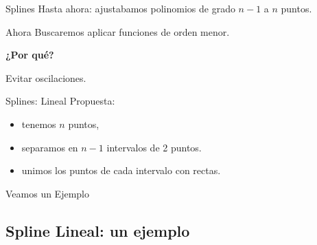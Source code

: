 \documentclass[xcolor=svgnames]{beamer} %
\theoremstyle{plain}
\renewcommand{\textbf}[1]{{\bfseries\textcolor{redUnq2}{#1}}}
\theoremstyle{definition}
\begin{document}
\begin{frame}{Splines}
Hasta ahora: ajustabamos polinomios de grado $n-1$ a $n$ puntos.\vspace{20pt} \pause

Ahora Buscaremos aplicar funciones de orden menor.\vspace{20pt}

\textbf{¿Por qué?}\vspace{10pt}\pause

\begin{tcolorbox}
\begin{center}
  Evitar oscilaciones.
\end{center}
\end{tcolorbox}

\end{frame}


\begin{frame}{Splines: Lineal}
  Propuesta: 
  \begin{itemize}
    \item tenemos $n$ puntos,  \pause
    \item separamos en $n-1$ intervalos de 2 puntos. \pause
    \item unimos los puntos de cada intervalo con rectas.\pause
  \end{itemize}
  
  \begin{tcolorbox}
    Veamos un Ejemplo
  \end{tcolorbox}  
\end{frame}

\subsection{Spline Lineal: un ejemplo}
\end{document}
